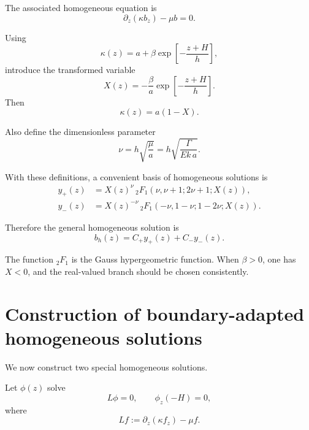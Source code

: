 \documentclass[10pt]{amsart}
\begin{document}
The associated homogeneous equation is
\begin{equation}
\partial_z\!\left(\kappa b_z\right)-\mu b =0.
\label{eq:homogeneous}
\end{equation}

Using
\[
\kappa(z)=a+\beta \exp\!\left[-\frac{z+H}{h}\right],
\]
introduce the transformed variable
\begin{equation}
X(z)
=
-\frac{\beta}{a}\exp\!\left[-\frac{z+H}{h}\right].
\label{eq:X_def}
\end{equation}
Then
\begin{equation}
\kappa(z)=a(1-X).
\end{equation}

Also define the dimensionless parameter
\begin{equation}
\nu
=
h\sqrt{\frac{\mu}{a}}
=
h\sqrt{\frac{\Gamma}{E k\,a}}.
\label{eq:nu_def}
\end{equation}

With these definitions, a convenient basis of homogeneous solutions is
\begin{align}
y_+(z)
&=
X(z)^{\nu}\,
{}_2F_1\!\left(\nu,\nu+1;2\nu+1;X(z)\right),
\label{eq:yplus}
\\[0.5em]
y_-(z)
&=
X(z)^{-\nu}\,
{}_2F_1\!\left(-\nu,1-\nu;1-2\nu;X(z)\right).
\label{eq:yminus}
\end{align}

Therefore the general homogeneous solution is
\begin{equation}
b_h(z)=C_+ y_+(z)+C_- y_-(z).
\label{eq:general_homogeneous}
\end{equation}

The function \({}_2F_1\) is the Gauss hypergeometric function. When \(\beta>0\), one has \(X<0\), and the real-valued branch should be chosen consistently.

\section{Construction of boundary-adapted homogeneous solutions}

We now construct two special homogeneous solutions.

Let \(\phi(z)\) solve
\begin{equation}
L\phi=0,
\qquad
\phi_z(-H)=0,
\label{eq:phi_def}
\end{equation}
where
\begin{equation}
L f := \partial_z(\kappa f_z)-\mu f.
\end{equation}
\end{document}
